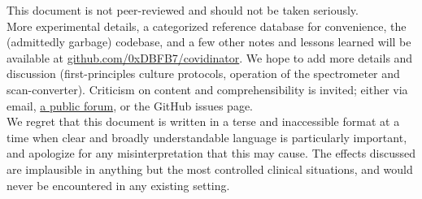 \documentclass[paper.tex]{subfiles}
\begin{document}
\begin{abstract}
%	
%	
%	
%	
%	
%	
%	
\end{abstract}

\begin{tcolorbox}
\noindent \small{This document is not peer-reviewed and should not be taken seriously.\\
	
More experimental details, a categorized reference database for convenience, the (admittedly garbage) codebase, and a few other notes and lessons learned will be available at 
\href{https://www.github.com/0xDBFB7/covidinator}{github.com/0xDBFB7/covidinator}. We hope to add more details and discussion (first-principles culture protocols, operation of the spectrometer and scan-converter). Criticism on content and comprehensibility is invited; either via email, \href{https://forum.0xdbfb7.com/t/discussion-on-covidinator/19}{a public forum}, or the GitHub issues page. \\

We regret that this document is written in a terse and inaccessible format at a time when clear and broadly understandable language is particularly important\cite{Re2021}, and apologize for any misinterpretation that this may cause. The effects discussed are implausible in anything but the most controlled clinical situations, and would never be encountered in any existing setting.

}
\end{tcolorbox}
\clearpage
\end{document}
